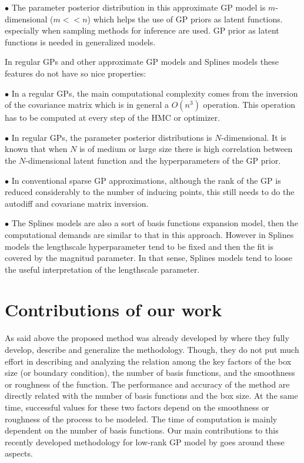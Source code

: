 \documentclass[]{interact}
\theoremstyle{plain}%
\theoremstyle{definition}
\theoremstyle{remark}
\begin{document}
\vspace{2mm}
$\bullet$ The parameter posterior distribution in this approximate GP model is $m$-dimensional ($m<<n$) which helps the use of GP priors as latent functions. especially when sampling methods for inference are used. GP prior as latent functions is needed in generalized models.

In regular GPs and other approximate GP models and Splines models these features do not have so nice properties:

\vspace{2mm}
$\bullet$ In a regular GPs, the main computational complexity comes from the inversion of the covariance matrix which is in general a $O(n^3)$ operation. This operation has to be computed at every step of the HMC or optimizer.

\vspace{2mm}
$\bullet$ In regular GPs, the parameter posterior distributions is $N$-dimensional. It is known that when $N$ is of medium or large size there is high correlation between the $N$-dimensional latent function and the hyperparameters of the GP prior.

\vspace{2mm}
$\bullet$ In conventional sparse GP approximations, although the rank of the GP is reduced considerably to the number of inducing points, this still needs to do the autodiff and covariane matrix inversion.

\vspace{2mm}
$\bullet$ The Splines models are also a sort of basis functions expansion model, then the computational demands are similar to that in this approach. However in Splines models the lengthscale hyperparameter tend to be fixed and then the fit is covered by the magnitud parameter. In that sense, Splines models tend to loose the useful interpretation of the lengthscale parameter.



\section{Contributions of our work}

As said above the proposed method was already developed by \cite{solin2018hilbert} where they fully develop, describe and generalize the methodology. Though, they do not put much effort in describing and analyzing the relation among the key factors of the box size (or boundary condition), the number of basis functions, and the smoothness or roughness of the function. The performance and accuracy of the method are directly related with the number of basis functions and the box size. At the same time, successful values for these two factors depend on the smoothness or roughness of the process to be modeled. The time of computation is mainly dependent on the number of basis functions. Our main contributions to this recently developed methodology for low-rank GP model by \cite{solin2018hilbert} goes around these aspects.
\end{document}
